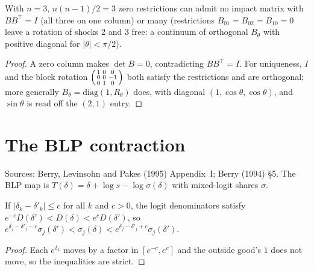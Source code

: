 \begin{theorem}
\label{thm:order-condition}
\leanok
With $n = 3$, $n(n-1)/2 = 3$ zero restrictions can admit no impact matrix with $BB^\top = I$ (all three on one column)
or many (restrictions $B_{01} = B_{02} = B_{10} = 0$ leave a rotation of shocks 2 and 3 free: a continuum of orthogonal $B_\theta$ with positive diagonal for $|\theta|<\pi/2$).
\end{theorem}
\begin{proof}
\leanok
A zero column makes $\det B = 0$, contradicting $BB^\top = I$. For uniqueness, $I$ and the block rotation
$\begin{psmallmatrix}1&0&0\\0&0&-1\\0&1&0\end{psmallmatrix}$ both satisfy the restrictions and are orthogonal; more generally $B_\theta = \mathrm{diag}(1, R_\theta)$ does, with diagonal $(1,\cos\theta,\cos\theta)$, and $\sin\theta$ is read off the $(2,1)$ entry.
\end{proof}

\section{The BLP contraction}
\label{sec:blp-contraction}

Sources: Berry, Levinsohn and Pakes (1995) Appendix~I; Berry (1994) \S5. The BLP map is
$T(\delta) = \delta + \log s - \log\sigma(\delta)$ with mixed-logit shares $\sigma$.

\begin{lemma}
\label{lem:blp-bounds}
\leanok
{}
If $|\delta_k - \delta'_k|\le c$ for all $k$ and $c>0$, the logit denominators satisfy
$e^{-c}D(\delta') < D(\delta) < e^cD(\delta')$, so
$e^{\delta_j-\delta'_j-c}\sigma_j(\delta') < \sigma_j(\delta) < e^{\delta_j-\delta'_j+c}\sigma_j(\delta')$.
\end{lemma}
\begin{proof}
\leanok
Each $e^{\delta_k}$ moves by a factor in $[e^{-c},e^c]$ and the outside good's $1$ does not move, so the inequalities
are strict.
\end{proof}

